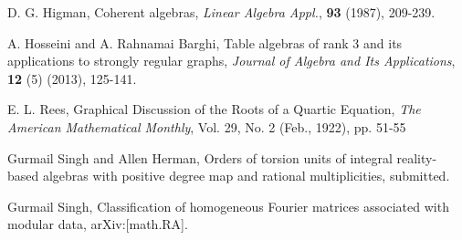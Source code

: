 \documentclass[12pt]{amsart}
\begin{document}
\begin{thebibliography}{10}
{ D. G. Higman, Coherent algebras, {\it Linear Algebra Appl.}, {\bf 93} (1987), 209-239.

 A. Hosseini and A. Rahnamai Barghi, Table algebras of rank 3 and its applications to strongly regular graphs, {\it Journal of Algebra and Its Applications}, {\bf 12} (5) (2013), 125-141.

E. L. Rees, Graphical Discussion of the Roots of a Quartic Equation, {\it The American Mathematical Monthly}, Vol. 29, No. 2 (Feb., 1922), pp. 51-55

 Gurmail Singh and Allen Herman, Orders of torsion units of integral reality-based algebras with positive degree map and rational multiplicities, submitted.

 Gurmail Singh, Classification of homogeneous Fourier matrices associated with modular data, arXiv:[math.RA].

}
\end{thebibliography}
\end{document}
